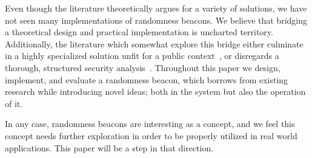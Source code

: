 Even though the literature theoretically argues for a variety of solutions, we have not seen many implementations of randomness beacons.
We believe that bridging a theoretical design and practical implementation is uncharted territory.
Additionally, the literature which somewhat explore this bridge either culminate in a highly specialized solution unfit for a public context~\cite{cascudo2017scrape, syta2017scalable}, or disregards a thorough, structured security analysis~\cite{bunz2017proofsof}.
Throughout this paper we design, implement, and evaluate a randomness beacon, which borrows from existing research while introducing novel ideas; both in the system but also the operation of it.

In any case, randomness beacons are interesting as a concept, and we feel this concept needs further exploration in order to be properly utilized in real world applications.
This paper will be a step in that direction.

